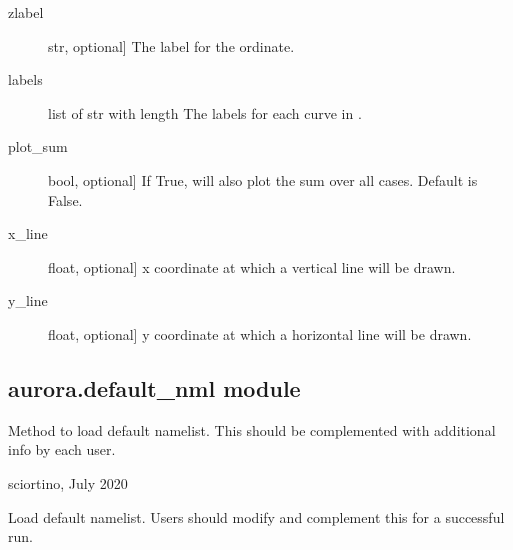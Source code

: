 \documentclass[letterpaper,10pt,english]{sphinxmanual}
\begin{document}
\begin{fulllineitems}
\begin{description}
\begin{description}
\item[{zlabel}] \leavevmode{[}str, optional{]}
The label for the ordinate.

\item[{labels}] \leavevmode{[}list of str with length \sphinxtitleref{P}{]}
The labels for each curve in .

\item[{plot\_sum}] \leavevmode{[}bool, optional{]}
If True, will also plot the sum over all  cases. Default is False.

\item[{x\_line}] \leavevmode{[}float, optional{]}
x coordinate at which a vertical line will be drawn.

\item[{y\_line}] \leavevmode{[}float, optional{]}
y coordinate at which a horizontal line will be drawn.

\end{description}

\end{description}

\end{fulllineitems}



\subsection{aurora.default\_nml module}
\label{\detokenize{aurora:module-aurora.default_nml}}\label{\detokenize{aurora:aurora-default-nml-module}}
Method to load default namelist. This should be complemented with additional info 
by each user.

sciortino, July 2020

\begin{fulllineitems}
\label{\detokenize{aurora:aurora.default_nml.load_default_namelist}}
Load default namelist. 
Users should modify and complement this for a successful run.

\end{fulllineitems}
\end{document}
